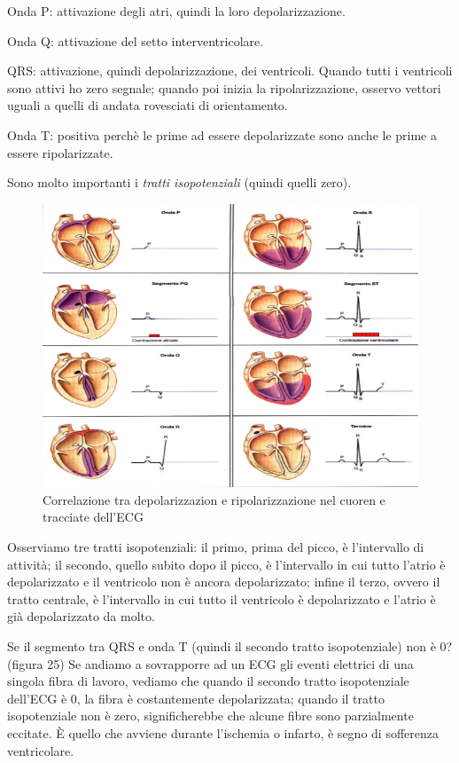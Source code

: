 \documentclass[a4paper,12pt]{article}
\begin{document}
Onda P: attivazione degli atri, quindi la loro depolarizzazione.

Onda Q: attivazione del setto interventricolare. 

QRS: attivazione, quindi depolarizzazione, dei ventricoli. Quando tutti i ventricoli sono attivi ho zero segnale; quando poi inizia la ripolarizzazione, osservo vettori uguali a quelli di andata rovesciati di orientamento.

Onda T: positiva perchè le prime ad essere depolarizzate sono anche le prime a essere ripolarizzate.

Sono molto importanti i \emph{tratti isopotenziali} (quindi quelli zero). 
\begin{figure}[H]
\centering
\includegraphics[scale=0.4]{immagine/boh.jpg}
\caption{Correlazione tra depolarizzazion e ripolarizzazione nel cuoren e tracciate dell'ECG}
\end{figure}

Osserviamo tre tratti isopotenziali: il primo, prima del picco, è l'intervallo di attività; il secondo, quello subito dopo il picco, è l'intervallo in cui tutto l'atrio è depolarizzato e il ventricolo non è ancora depolarizzato; infine il terzo, ovvero il tratto centrale, è l'intervallo in cui tutto il ventricolo è depolarizzato e l'atrio è già depolarizzato da molto.

Se il segmento tra QRS e onda T (quindi il secondo tratto isopotenziale) non è 0? (figura 25) Se andiamo a sovrapporre ad un ECG gli eventi elettrici di una singola fibra di lavoro, vediamo che quando il secondo tratto isopotenziale dell'ECG è 0, la fibra è costantemente depolarizzata; quando il tratto isopotenziale non è zero, significherebbe che alcune fibre sono parzialmente eccitate. È quello che avviene durante l'ischemia o infarto, è segno di sofferenza ventricolare.
\end{document}
